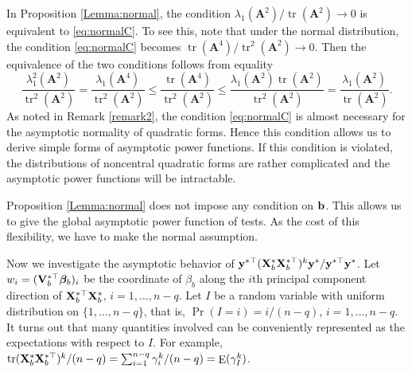\documentclass[smallextended]{svjour3}       %
\DeclareMathOperator{\mytr}{tr}
\DeclareMathOperator{\myE}{E}
\newcommand{\By}{\mathbf{y}}    \newcommand{\Bz}{\mathbf{z}}
\newcommand{\BA}{\mathbf{A}}    \newcommand{\BB}{\mathbf{B}}    \newcommand{\BC}{\mathbf{C}}    \newcommand{\BD}{\mathbf{D}}    \newcommand{\BE}{\mathbf{E}}    \newcommand{\BF}{\mathbf{F}}    \newcommand{\BG}{\mathbf{G}}    \newcommand{\BH}{\mathbf{H}}    \newcommand{\BI}{\mathbf{I}}    \newcommand{\BJ}{\mathbf{J}}    \newcommand{\BK}{\mathbf{K}}    \newcommand{\BL}{\mathbf{L}}
\newcommand{\bfsym}[1]{\ensuremath{\boldsymbol{#1}}}
\def\bbeta{\bfsym \beta}
\begin{document}
\begin{remark}
    In Proposition \ref{Lemma:normal}, the condition $\lambda_1(\BA^2) / \mytr(\BA^2) \to 0$ is equivalent to \eqref{eq:normalC}.
    To see this, note that under the normal distribution, the condition \eqref{eq:normalC} becomes $\mytr(\BA^4)/ \mytr^2(\BA^2) \to 0$.
    Then the equivalence of the two conditions follows from equality
    \begin{equation*}
        \frac{\lambda_1^2(\BA^2)}{\mytr^2(\BA^2)} 
        =
        \frac{\lambda_1(\BA^4)}{\mytr^2(\BA^2)} 
        \leq
        \frac{\mytr(\BA^4)}{\mytr^2(\BA^2)} \leq 
        \frac{\lambda_1(\BA^2)\mytr(\BA^2)}{\mytr^2(\BA^2)}
        =
        \frac{\lambda_1(\BA^2)}{\mytr(\BA^2)}. 
    \end{equation*}
    As noted in Remark \ref{remark2}, the condition \eqref{eq:normalC} is almost necessary for the asymptotic normality of quadratic forms.
    Hence this condition allows us to derive simple forms of asymptotic power functions.
    If this condition is violated, the distributions of noncentral quadratic forms are rather complicated and the asymptotic power functions will be intractable.
\end{remark}

\begin{remark}
    Proposition \ref{Lemma:normal} does not impose any condition on $\mathbf{b}$.
    This allows us to give the global asymptotic power function of tests.
    As the cost of this flexibility, we have to make the normal assumption.
\end{remark}


Now we investigate the asymptotic behavior of
    ${
\By^{*\top}
    (\BX_b^* \BX_b^{*\top})^{k} 
        \By^*
    }/{\By^{*\top} \By^*}$.
Let $w_i=(\BV_b^{*\top} \bbeta_b)_i$ be the coordinate of $\beta_b$ along the $i$th principal component direction of $\mathbf{X}_b^{*\top} \mathbf{X}_b^*$, $i=1,\ldots, n-q$.
Let $I$ be a random variable with uniform distribution on $\{1,\ldots, n-q\}$, that is, $\Pr \left( I=i \right)=i/(n-q)$, $i=1,\ldots, n-q$.
It turns out that many quantities involved can be conveniently represented as the expectations with respect to $I$.
For example, $
        {
            \mytr(\BX_b^* \BX_b^{*\top})^k
        }/
        (n-q )
        =
        \sum_{i=1}^{n-q} \gamma_i^k /(n-q)
        =\myE (\gamma_I^k)
$.
\end{document}
